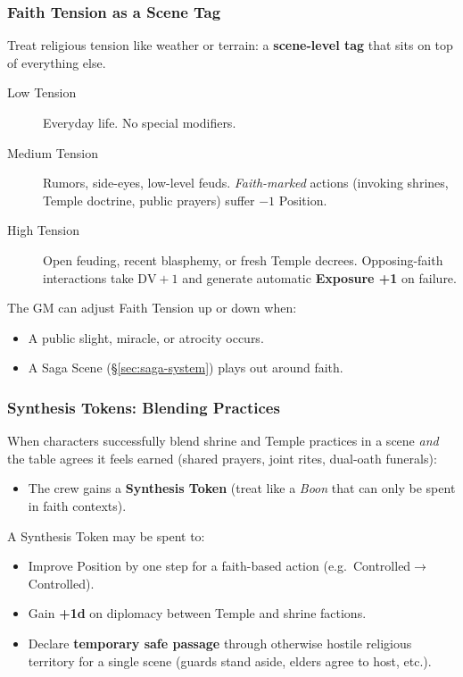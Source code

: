 \documentclass[11pt]{article}
\begin{document}
\subsubsection*{Faith Tension as a Scene Tag}

Treat religious tension like weather or terrain: a \textbf{scene-level tag} that sits on top of
everything else.

\begin{description}
  \item[Low Tension] Everyday life. No special modifiers.
  \item[Medium Tension] Rumors, side-eyes, low-level feuds. \emph{Faith-marked} actions (invoking
    shrines, Temple doctrine, public prayers) suffer \(-1\) Position.
  \item[High Tension] Open feuding, recent blasphemy, or fresh Temple decrees. Opposing-faith
    interactions take \(\mathrm{DV}+1\) and generate automatic \textbf{Exposure +1} on failure.
\end{description}

The GM can adjust Faith Tension up or down when:
\begin{itemize}
  \item A public slight, miracle, or atrocity occurs.
  \item A Saga Scene (\S\ref{sec:saga-system}) plays out around faith.
\end{itemize}

\subsubsection*{Synthesis Tokens: Blending Practices}

When characters successfully blend shrine and Temple practices in a scene \emph{and} the table
agrees it feels earned (shared prayers, joint rites, dual-oath funerals):

\begin{itemize}
  \item The crew gains a \textbf{Synthesis Token} (treat like a \emph{Boon} that can only be spent
        in faith contexts).
\end{itemize}

A Synthesis Token may be spent to:
\begin{itemize}
  \item Improve Position by one step for a faith-based action (e.g.\ Controlled$\to$Controlled).
  \item Gain \textbf{+1d} on diplomacy between Temple and shrine factions.
  \item Declare \textbf{temporary safe passage} through otherwise hostile religious territory for
        a single scene (guards stand aside, elders agree to host, etc.).
\end{itemize}
\end{document}
